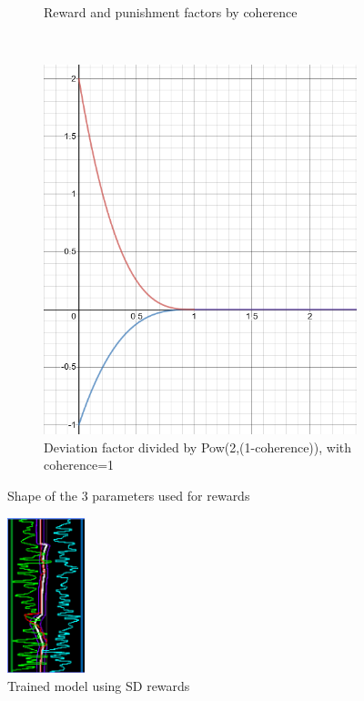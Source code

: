 \begin{figure}
\begin{subfigure}[b]{0.3\textwidth}
        \caption{Reward and punishment factors by coherence}
        \label{fig:stdf}
    \end{subfigure}
    ~ %
    \begin{subfigure}[b]{0.3\textwidth}
        \includegraphics[width=\textwidth]{img/stdDevfactor.png}
        \caption{Deviation factor divided by Pow(2,(1-coherence)), with coherence=1}
        \label{fig:devf}
    \end{subfigure}
    \caption{Shape of the 3 parameters used for rewards}
		\label{fig:stdshapes}
\end{figure}

\begin{figure}
    \centering
    \includegraphics[width=0.2\textwidth]{img/graphsSTDrew.png}
		\caption{Trained model using SD rewards}
		\label{fig:stdrewards}
\end{figure}

